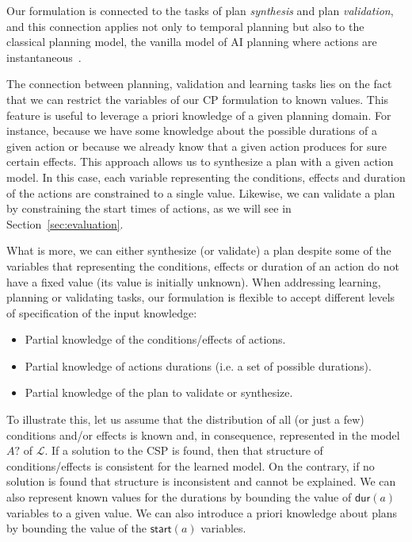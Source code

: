 \documentclass{ecai}
\newcommand{\dur}{\mathsf{dur}}    %
\newcommand{\start}{\mathsf{start}}%
\begin{document}
Our formulation is connected to the tasks of plan {\em synthesis} and plan {\em validation}, and this connection applies not only to temporal planning but also to the classical planning model, the vanilla model of AI planning where actions are instantaneous~\cite{geffner2013concise}. 

The connection between planning, validation and learning tasks lies on the fact that we can restrict the variables of our CP formulation to known values. This feature is useful to leverage a priori knowledge of a given planning domain. For instance, because we have some knowledge about the possible durations of a given action or because we already know that a given action produces for sure certain effects. This approach allows us to synthesize a plan with a given action model. In this case, each variable representing the conditions, effects and duration of the actions are constrained to a single value. Likewise, we can validate a plan by constraining the start times of actions, as we will see in Section~\ref{sec:evaluation}.

What is more, we can either synthesize (or validate) a plan despite some of the variables that representing the conditions, effects or duration of an action do not have a fixed value (its value is initially unknown). When addressing learning, planning or validating tasks, our formulation is flexible to accept different levels of specification of the input knowledge:

\begin{itemize}
\item Partial knowledge of the conditions/effects of actions.
\item Partial knowledge of actions durations (i.e. a set of possible durations).
\item Partial knowledge of the plan to validate or synthesize.
\end{itemize}

To illustrate this, let us assume that the distribution of all (or just a few) conditions and/or effects is known and, in consequence, represented in the model $A?$ of $\mathcal{L}$. If a solution to the CSP is found, then that structure of conditions/effects is consistent for the learned model. On the contrary, if no solution is found that structure is inconsistent and cannot be explained. We can also represent known values for the durations by bounding the value of $\dur(a)$ variables to a given value. We can also introduce a priori knowledge about plans by bounding the value of the $\start(a)$ variables.
\end{document}
